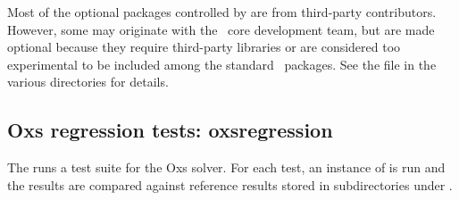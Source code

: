 Most of the optional packages controlled by  are from
third-party contributors.  However, some may originate with the
\OOMMF\ core development team, but are made optional because they
require third-party libraries or are considered too experimental to be
included among the standard \OOMMF\ packages.  See the  file
in the various  directories
for details.


\subsection{Oxs regression tests:
            oxsregression\label{sec:oxsregression}}%

The  runs a test suite for the Oxs solver.  For
each test, an instance of
is run and the results are compared against reference results stored
in subdirectories under .


